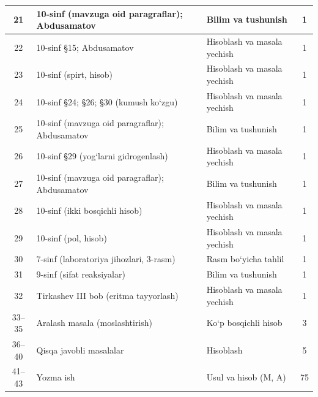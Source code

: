 \documentclass[11pt,a4paper]{article}
\begin{document}
{\begin{longtable}{|c|p{7.2cm}|p{5.4cm}|c|}
21 & 10-sinf (mavzuga oid paragraflar); Abdusamatov & Bilim va tushunish & 1\\\hline
22 & 10-sinf \S{}15; Abdusamatov & Hisoblash va masala yechish & 1\\\hline
23 & 10-sinf (spirt, hisob) & Hisoblash va masala yechish & 1\\\hline
24 & 10-sinf \S{}24; \S{}26; \S{}30 (kumush ko`zgu) & Hisoblash va masala yechish & 1\\\hline
25 & 10-sinf (mavzuga oid paragraflar); Abdusamatov & Bilim va tushunish & 1\\\hline
26 & 10-sinf \S{}29 (yog`larni gidrogenlash) & Hisoblash va masala yechish & 1\\\hline
27 & 10-sinf (mavzuga oid paragraflar); Abdusamatov & Bilim va tushunish & 1\\\hline
28 & 10-sinf (ikki bosqichli hisob) & Hisoblash va masala yechish & 1\\\hline
29 & 10-sinf (pol, hisob) & Hisoblash va masala yechish & 1\\\hline
30 & 7-sinf (laboratoriya jihozlari, 3-rasm) & Rasm bo`yicha tahlil & 1\\\hline
31 & 9-sinf (sifat reaksiyalar) & Bilim va tushunish & 1\\\hline
32 & Tirkashev III bob (eritma tayyorlash) & Hisoblash va masala yechish & 1\\\hline
33--35 & Aralash masala (moslashtirish) & Ko`p bosqichli hisob & 3\\\hline
36--40 & Qisqa javobli masalalar & Hisoblash & 5\\\hline
41--43 & Yozma ish & Usul va hisob (M, A) & 75\\\hline
\end{longtable}}
\end{document}
